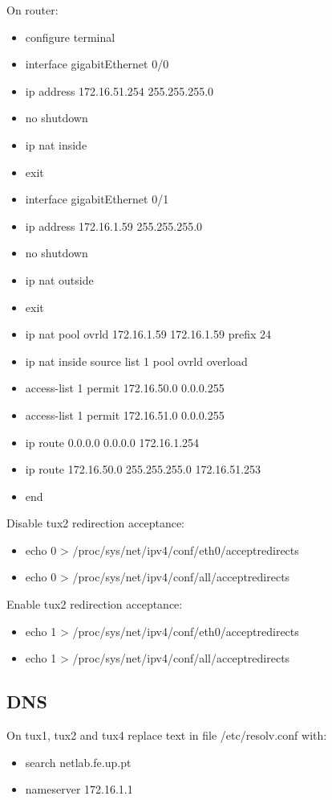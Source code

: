 \documentclass[11pt,a4paper,reqno]{article}
\numberwithin{equation}{section}
\begin{document}
\begin{appendices}
On router:

\begin{itemize}[label=-]
\item configure terminal
\item interface gigabitEthernet 0/0
\item ip address 172.16.51.254 255.255.255.0
\item no shutdown
\item ip nat inside
\item exit
\item interface gigabitEthernet 0/1
\item ip address 172.16.1.59 255.255.255.0
\item no shutdown
\item ip nat outside
\item exit
\item ip nat pool ovrld 172.16.1.59 172.16.1.59 prefix 24
\item ip nat inside source list 1 pool ovrld overload
\item access-list 1 permit 172.16.50.0 0.0.0.255
\item access-list 1 permit 172.16.51.0 0.0.0.255
\item ip route 0.0.0.0 0.0.0.0 172.16.1.254
\item ip route 172.16.50.0 255.255.255.0 172.16.51.253
\item end
\end{itemize}

Disable tux2 redirection acceptance:

\begin{itemize}[label=-]
\item echo 0 > /proc/sys/net/ipv4/conf/eth0/accept\textunderscore redirects
\item echo 0 > /proc/sys/net/ipv4/conf/all/accept\textunderscore redirects 
\end{itemize}

Enable tux2 redirection acceptance:

\begin{itemize}[label=-]
\item echo 1 > /proc/sys/net/ipv4/conf/eth0/accept\textunderscore redirects
\item echo 1 > /proc/sys/net/ipv4/conf/all/accept\textunderscore redirects
\end{itemize}

\subsection{DNS}

On tux1, tux2 and tux4 replace text in file /etc/resolv.conf with:

\begin{itemize}[label=-]
\item search netlab.fe.up.pt
\item nameserver 172.16.1.1
\end{itemize}


\end{appendices}
\end{document}

